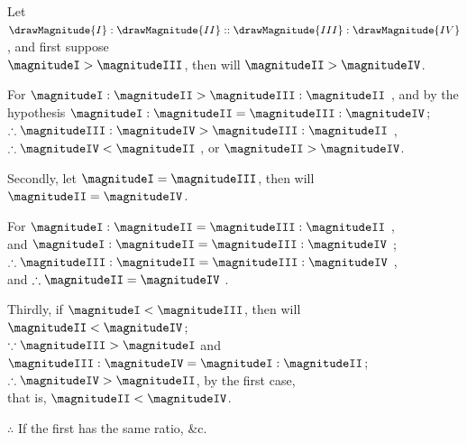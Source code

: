 \documentclass[booklanguage=english]{byrnebook}
\begin{document}
\begin{center}
Let $\drawMagnitude{I} : \drawMagnitude{II} :: \drawMagnitude{III} : \drawMagnitude{IV}$, and first suppose\\
$\magnitudeI > \magnitudeIII$, then will $\magnitudeII > \magnitudeIV$.

For $\magnitudeI : \magnitudeII > \magnitudeIII : \magnitudeII$ , and by the hypothesis $\magnitudeI : \magnitudeII = \magnitudeIII : \magnitudeIV$;\\
$\therefore \magnitudeIII : \magnitudeIV > \magnitudeIII : \magnitudeII$ ,\\
$\therefore \magnitudeIV < \magnitudeII$ , or $\magnitudeII > \magnitudeIV$.

Secondly, let $\magnitudeI = \magnitudeIII$, then will $\magnitudeII = \magnitudeIV$.

For $\magnitudeI : \magnitudeII = \magnitudeIII : \magnitudeII$ ,\\
and $\magnitudeI : \magnitudeII = \magnitudeIII : \magnitudeIV$ \byref{\hypref};\\
$\therefore \magnitudeIII : \magnitudeII = \magnitudeIII : \magnitudeIV$ ,\\
and $\therefore \magnitudeII = \magnitudeIV$ .

Thirdly, if $\magnitudeI < \magnitudeIII$, then will $\magnitudeII < \magnitudeIV$;\\
$\because \magnitudeIII > \magnitudeI$ and $\magnitudeIII : \magnitudeIV = \magnitudeI : \magnitudeII$;\\ %
$\therefore \magnitudeIV > \magnitudeII$, by the first case,\\
that is, $\magnitudeII < \magnitudeIV$.

$\therefore$ If the first has the same ratio, \&c.
\end{center}

\vfill\pagebreak

\end{document}
